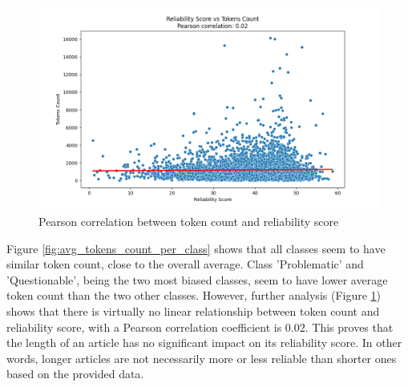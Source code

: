 \begin{figure}[htbp]
    \centering
    \includegraphics[width=0.9\linewidth]{figures/correlation_tokens_reliability_score.png}
    \caption{Pearson correlation between token count and reliability score}
    \label{fig:pearson_correlation}
\end{figure}


Figure \ref{fig:avg_tokens_count_per_class} shows that all classes seem to have similar token count, close to the overall average. Class 'Problematic' and 'Questionable', being the two most biased classes, seem to have lower average token count than the two other classes. However, further analysis (Figure \ref{fig:pearson_correlation}) shows that there is virtually no linear relationship between token count and reliability score, with a Pearson correlation coefficient is 0.02. This proves that the length of an article has no significant impact on its reliability score. In other words, longer articles are not necessarily more or less reliable than shorter ones based on the provided data.

